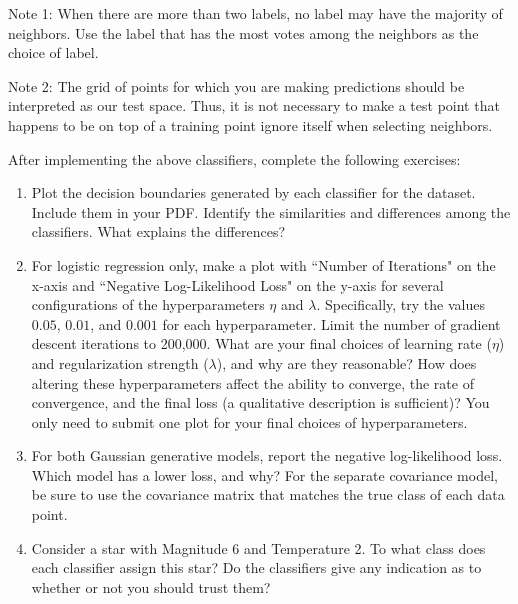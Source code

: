 \documentclass[submit]{harvardml}
\begin{document}
\begin{problem}
\begin{enumerate}[label=\alph*)]
  Note 1: When there are more than two labels, no label may have the
  majority of neighbors.  Use the label that has the most votes among
  the neighbors as the choice of label. 

  Note 2: The grid of points for which you are making predictions
  should be interpreted as our test space.  Thus, it is not necessary
  to make a test point that happens to be on top of a training point
  ignore itself when selecting neighbors.

\end{enumerate}

After implementing the above classifiers, complete the following exercises:

\begin{enumerate}
    \item Plot the decision boundaries generated by each classifier for the dataset. Include them in your PDF. 
    Identify the similarities and differences among the classifiers. What explains the differences?
    
    \item For logistic regression only,  make a plot with
      ``Number of Iterations" on the x-axis and ``Negative Log-Likelihood Loss" on the y-axis for several
      configurations of the hyperparameters $\eta$ and $\lambda$.  Specifically,  try the values $0.05$,  $0.01$,  and $0.001$ for each hyperparameter.  Limit the number of gradient descent iterations to 200,000.  What are your final choices of learning rate
      ($\eta$) and regularization strength ($\lambda$), and why are they reasonable? How
      does altering these hyperparameters affect the ability to converge,  the rate of convergence,  and the final loss (a qualitative description is sufficient)? You only need to submit one plot for your final choices of hyperparameters.

    \item For both Gaussian generative models, report the negative log-likelihood loss. Which model has a lower loss, and why?
      For the separate covariance model, be sure to use
      the covariance matrix that matches the true class of each data
      point.
    
    \item Consider a star with Magnitude 6 and Temperature 2.
      To what class does each classifier assign this star? Do the
      classifiers give any indication as to whether or not you should
  trust them?
\end{enumerate}
\end{problem}
\end{document}
